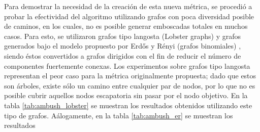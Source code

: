 



Para demostrar la necesidad de la creaci\'on de esta nueva m\'etrica,
se procedi\'o a probar la efectividad del algoritmo utilizando grafos
con poca diversidad posible de caminos, en los cuales, no es posible
generar emboscadas totales en muchos casos. Para esto, se utilizaron
grafos tipo langosta (Lobster graphs) \cite{Gal09} y grafos generados
bajo el modelo propuesto por Erd\H{o}s y R{\'e}nyi (grafos binomiales)
\cite{ER59}, siendo \'estos convertidos a grafos dirigidos con el fin de
reducir el n\'umero de componentes fuertemente conexas. Los experimentos sobre
grafos tipo langosta representan el peor caso para la m\'etrica originalmente
propuesta; dado que estos son \'arboles, existe s\'olo un camino entre
cualquier par de nodos, por lo que no es posible cubrir aquellos nodos
escapatoria sin pasar por el nodo objetivo. En la tabla \ref{tab:ambush_lobster}
se muestran los resultados obtenidos utilizando este tipo de grafos.
A\'alogamente, en la tabla \ref{tab:ambush_er} se muestran los resultados
